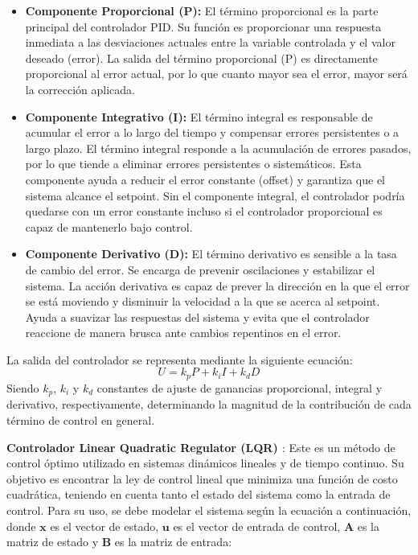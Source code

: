 \begin{itemize}
	\item \textbf{Componente Proporcional (P):} El término proporcional es la parte principal del controlador PID. Su función es proporcionar una respuesta inmediata a las desviaciones actuales entre la variable controlada y el valor deseado (error). La salida del término proporcional (P) es directamente proporcional al error actual, por lo que cuanto mayor sea el error, mayor será la corrección aplicada.
	
	\item \textbf{Componente Integrativo (I):} El término integral es responsable de acumular el error a lo largo del tiempo y compensar errores persistentes o a largo plazo. El término integral responde a la acumulación de errores pasados, por lo que tiende a eliminar errores persistentes o sistemáticos. Esta componente ayuda a reducir el error constante (offset) y garantiza que el sistema alcance el setpoint. Sin el componente integral, el controlador podría quedarse con un error constante incluso si el controlador proporcional es capaz de mantenerlo bajo control.
	
	\item \textbf{Componente Derivativo (D):} El término derivativo es sensible a la tasa de cambio del error. Se encarga de prevenir oscilaciones y estabilizar el sistema. La acción derivativa es capaz de prever la dirección en la que el error se está moviendo y disminuir la velocidad a la que se acerca al setpoint. Ayuda a suavizar las respuestas del sistema y evita que el controlador reaccione de manera brusca ante cambios repentinos en el error.
\end{itemize}

La salida del controlador se representa mediante la siguiente ecuación:
\[
U = k_p P + k_i I + k_d D
\]
Siendo $k_p$, $k_i$ y $k_d$ constantes de ajuste de ganancias proporcional, integral y derivativo, respectivamente, determinando la magnitud de la contribución de cada término de control en general.

\textbf{Controlador Linear Quadratic Regulator (LQR) \cite{ref29}}: Este es un método de control óptimo utilizado en sistemas dinámicos lineales y de tiempo continuo. Su objetivo es encontrar la ley de control lineal que minimiza una función de costo cuadrática, teniendo en cuenta tanto el estado del sistema como la entrada de control. Para su uso, se debe modelar el sistema según la ecuación a continuación, donde \( \mathbf{x} \) es el vector de estado, \( \mathbf{u} \) es el vector de entrada de control, \( \mathbf{A} \) es la matriz de estado y \( \mathbf{B} \) es la matriz de entrada:

